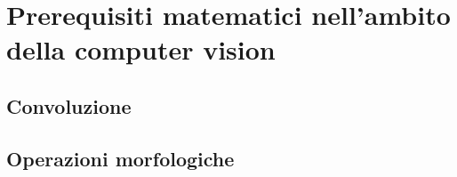 \chapter{Prerequisiti matematici nell'ambito della computer vision}
\label{chap:math-prerequisites}

\section{Convoluzione}
\section{Operazioni morfologiche}
